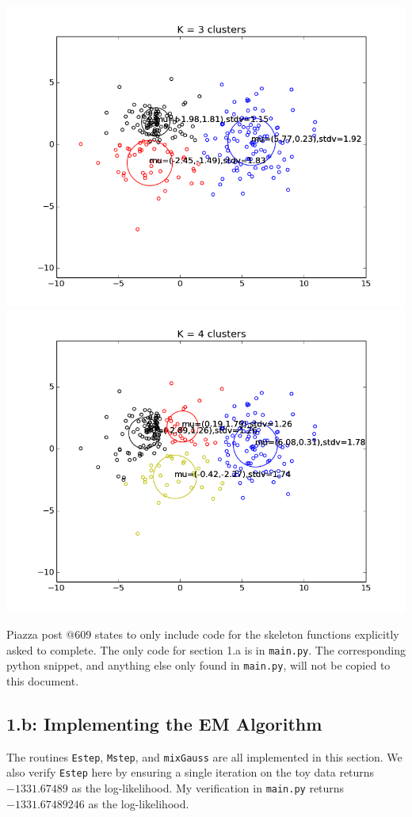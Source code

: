 \documentclass{article}
\begin{document}
\begin{center}
      \includegraphics[scale=0.4]{sec1a_k3.png}  
      \includegraphics[scale=0.4]{sec1a_k4.png} \\
    \end{center}
     
    Piazza post @609 states to only include code for the skeleton functions explicitly asked to complete.
    The only code for section 1.a is in \texttt{main.py}. 
    The corresponding python snippet, and anything else only found in \texttt{main.py}, will not be copied to this document.

\pagebreak
\subsection*{1.b: Implementing the EM Algorithm}  The routines \texttt{Estep}, \texttt{Mstep}, and \texttt{mixGauss} are all implemented in this section. We also verify \texttt{Estep} here by ensuring a single iteration on the toy data returns $-1331.67489$ as the log-likelihood. My verification in \texttt{main.py} returns $-1331.67489246$ as the log-likelihood.
\end{document}
